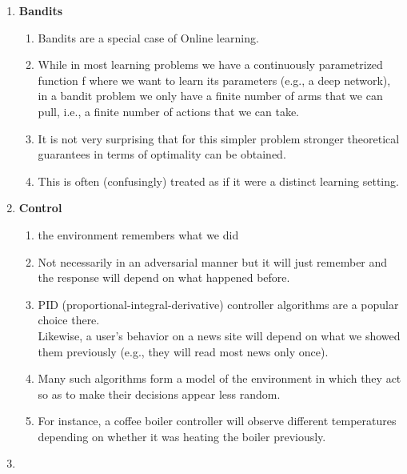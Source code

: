 \begin{enumerate}[itemsep=0.3cm]
    \item \textbf{Bandits}
    \begin{enumerate}
        \item Bandits are a special case of Online learning.

        \item While in most learning problems we have a continuously parametrized function f where we want to learn its parameters (e.g., a deep network), in a bandit problem we only have a finite number of arms that we can pull, i.e., a finite number of actions that we can take. 

        \item It is not very surprising that for this simpler problem stronger theoretical guarantees in terms of optimality can be obtained. 

        \item This is often (confusingly) treated as if it were a distinct learning setting.

    \end{enumerate}

    \item \textbf{Control}
    \begin{enumerate}
        \item the environment remembers what we did

        \item Not necessarily in an adversarial manner but it will just remember and the response will depend on what happened before.

        \item PID (proportional-integral-derivative) controller algorithms are a popular choice there.\\
        Likewise, a user’s behavior on a news site will depend on what we showed them previously (e.g., they will read most news only once).

        \item Many such algorithms form a model of the environment in which they act so as to make their decisions appear less random. 

        \item For instance, a coffee boiler controller will observe different temperatures depending on whether it was heating the boiler previously.

    \end{enumerate}

    \item {}
\end{enumerate}


